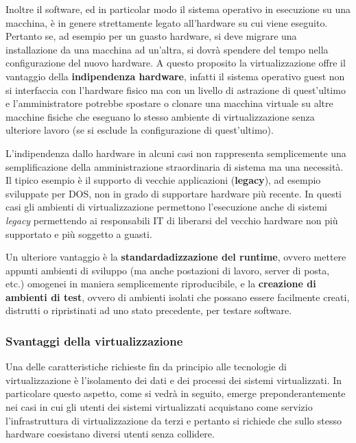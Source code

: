 Inoltre il software, ed in particolar modo il sistema operativo in
esecuzione su una macchina, è in genere strettamente legato all'hardware
su cui viene eseguito. Pertanto se, ad esempio per un guasto hardware,
si deve migrare una installazione da una macchina ad un'altra, si dovrà
spendere del tempo nella configurazione del nuovo hardware. A questo
proposito la virtualizzazione offre il vantaggio della
\textbf{indipendenza hardware}, infatti il sistema operativo guest non
si interfaccia con l'hardware fisico ma con un livello di astrazione di
quest'ultimo e l'amministratore potrebbe spostare o clonare una macchina
virtuale su altre macchine fisiche che eseguano lo stesso ambiente di
virtualizzazione senza ulteriore lavoro (se si esclude la configurazione
di quest'ultimo).

L'indipendenza dallo hardware in alcuni casi non rappresenta
semplicemente una semplificazione della amministrazione straordinaria di
sistema ma una necessità. Il tipico esempio è il supporto di vecchie
applicazioni (\textbf{legacy}), ad esempio sviluppate per DOS, non in
grado di supportare hardware più recente. In questi casi gli ambienti di
virtualizzazione permettono l'esecuzione anche di sistemi \emph{legacy}
permettendo ai responsabili IT di liberarsi del vecchio hardware non più
supportato e più soggetto a guasti.

Un ulteriore vantaggio è la \textbf{standardadizzazione del runtime},
ovvero mettere appunti ambienti di sviluppo (ma anche postazioni di
lavoro, server di posta, etc.) omogenei in maniera semplicemente
riproducibile, e la \textbf{creazione di ambienti di test}, ovvero di
ambienti isolati che possano essere facilmente creati, distrutti o
ripristinati ad uno stato precedente, per testare software.

\subsubsection{Svantaggi della
virtualizzazione}\label{svantaggi-della-virtualizzazione}

Una delle caratteristiche richieste fin da principio alle tecnologie di
virtualizzazione è l'isolamento dei dati e dei processi dei sistemi
virtualizzati. In particolare questo aspetto, come si vedrà in seguito,
emerge preponderantemente nei casi in cui gli utenti dei sistemi
virtualizzati acquistano come servizio l'infrastruttura di
virtualizzazione da terzi e pertanto si richiede che sullo stesso
hardware coesistano diversi utenti senza collidere.

